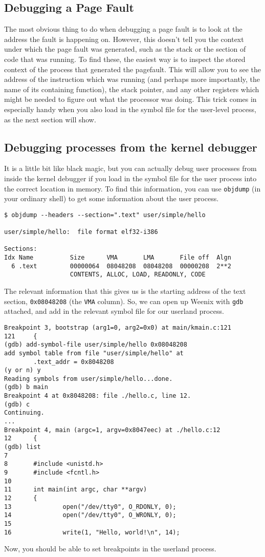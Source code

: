 \subsection{Debugging a Page Fault}

The most obvious thing to do when debugging a page fault is to look at the address the fault is happening on. However, this doesn't tell you the context under which the page fault was generated, such as the stack or the section of code that was running. To find these, the easiest way is to inspect the stored context of the process that generated the pagefault. This will allow you to see the address of the instruction which was running (and perhaps more importantly, the name of its containing function), the stack pointer, and any other registers which might be needed to figure out what the processor was doing. This trick comes in especially handy when you also load in the symbol file for the user-level process, as the next section will show.

\subsection{Debugging processes from the kernel debugger}

It is a little bit like black magic, but you can actually debug user processes from inside the kernel debugger if you load in the symbol file for the user process into the correct location in memory. To find this information, you can use \texttt{objdump} (in your ordinary shell) to get some information about the user process.
\begin{verbatim}
$ objdump --headers --section=".text" user/simple/hello

user/simple/hello:  file format elf32-i386

Sections:
Idx Name          Size      VMA       LMA       File off  Algn
  6 .text         00000064  08048208  08048208  00000208  2**2
                  CONTENTS, ALLOC, LOAD, READONLY, CODE\end{verbatim}
The relevant information that this gives us is the starting address of the text section, \texttt{0x08048208} (the \texttt{VMA} column). So, we can open up Weenix with \texttt{gdb} attached, and add in the relevant symbol file for our userland process.
\begin{verbatim}
Breakpoint 3, bootstrap (arg1=0, arg2=0x0) at main/kmain.c:121
121     {
(gdb) add-symbol-file user/simple/hello 0x08048208
add symbol table from file "user/simple/hello" at
        .text_addr = 0x8048208
(y or n) y
Reading symbols from user/simple/hello...done.
(gdb) b main
Breakpoint 4 at 0x8048208: file ./hello.c, line 12.
(gdb) c
Continuing.
...
Breakpoint 4, main (argc=1, argv=0x8047eec) at ./hello.c:12
12      {
(gdb) list
7
8       #include <unistd.h>
9       #include <fcntl.h>
10
11      int main(int argc, char **argv)
12      {
13              open("/dev/tty0", O_RDONLY, 0);
14              open("/dev/tty0", O_WRONLY, 0);
15
16              write(1, "Hello, world!\n", 14);\end{verbatim}
Now, you should be able to set breakpoints in the userland process.

